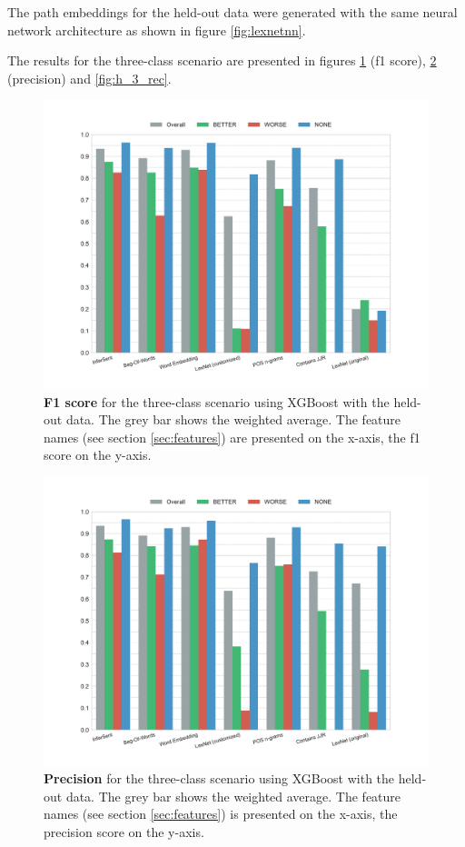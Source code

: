 The path embeddings for the held-out data were generated with the same neural network architecture as shown in figure \ref{fig:lexnetnn}.

The results for the three-class scenario are presented in figures \ref{fig:h_3_f1} (f1 score), \ref{fig:h_3_prec} (precision) and \ref{fig:h_3_rec}.


\begin{figure}[htbp]
         \caption{\textbf{F1 score} for the three-class scenario using XGBoost with the held-out data. The grey bar shows the weighted average. The feature names (see section \ref{sec:features}) are presented on the x-axis, the f1 score on the y-axis.} 
    \label{fig:h_3_f1}
    \centering
	\includegraphics[width=0.9\linewidth]{images/heldout/h-f1-False}
    \end{figure}
    


\begin{figure}[htbp]
         \caption{\textbf{Precision} for the three-class scenario using XGBoost with the held-out data. The grey bar shows the weighted average. The feature names (see section \ref{sec:features}) is presented on the x-axis, the precision score on the y-axis.} 
    \label{fig:h_3_prec}
    \centering
	\includegraphics[width=0.9\linewidth]{images/heldout/h-precision-False}
    \end{figure}
    
